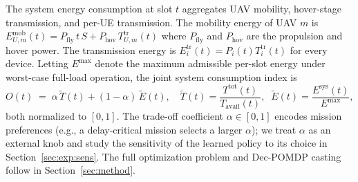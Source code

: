 The system energy consumption at slot $t$ aggregates UAV mobility,
hover-stage transmission, and per-UE transmission. The mobility energy of
UAV $m$ is $E^{\mathrm{mob}}_{U,m}(t)=P_{\mathrm{fly}}\,t\,S+
P_{\mathrm{hov}}\,T^{\mathrm{tr}}_{\!U,m}(t)$ where
$P_{\mathrm{fly}}$ and $P_{\mathrm{hov}}$ are the propulsion and hover
power. The transmission energy is
$E^{\mathrm{tr}}_{i}(t)=P_{i}(t)T^{\mathrm{tr}}_{i}(t)$ for every
device. Letting $E^{\max}$ denote the maximum admissible per-slot
energy under worst-case full-load operation, the joint system
consumption index is
\begin{equation}
O(t) \;=\; \alpha\,\widetilde{T}(t)
       + (1-\alpha)\,\widetilde{E}(t),
\quad
\widetilde{T}(t)=\frac{T^{\mathrm{tot}}(t)}{T_{\mathrm{avail}}(t)},
\;\;
\widetilde{E}(t)=\frac{E^{\mathrm{sys}}(t)}{E^{\max}},
\label{eq:cost}
\end{equation}
both normalized to $[0,1]$. The trade-off coefficient $\alpha\in[0,1]$
encodes mission preferences (e.g., a delay-critical mission selects a
larger $\alpha$); we treat $\alpha$ as an external knob and study the
sensitivity of the learned policy to its choice in
Section~\ref{sec:exp:sens}. The full optimization problem and Dec-POMDP
casting follow in Section~\ref{sec:method}.
